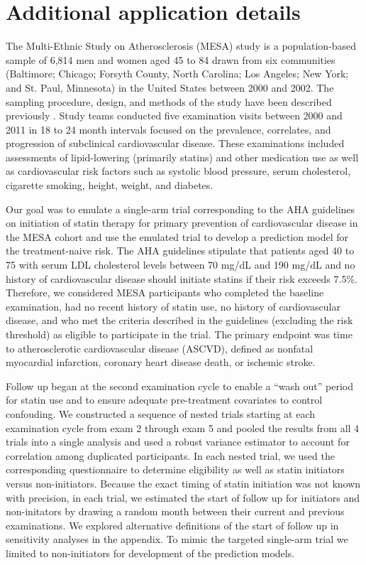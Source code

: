 \newpage
\section{Additional application details}
The Multi-Ethnic Study on Atherosclerosis (MESA) study is a population-based sample of 6,814 men and women aged 45 to 84 drawn from six communities (Baltimore; Chicago; Forsyth County, North Carolina; Los Angeles; New York; and St. Paul, Minnesota) in the United States between 2000 and 2002. The sampling procedure, design, and methods of the study have been described previously \cite{bild_multi-ethnic_2002}. Study teams conducted five examination visits between 2000 and 2011 in 18 to 24 month intervals focused on the prevalence, correlates, and progression of subclinical cardiovascular disease. These examinations included assessments of lipid-lowering (primarily statins) and other medication use as well as cardiovascular risk factors such as systolic blood pressure, serum cholesterol, cigarette smoking, height, weight, and diabetes. 

Our goal was to emulate a single-arm trial corresponding to the AHA guidelines on initiation of statin therapy for primary prevention of cardiovascular disease in the MESA cohort and use the emulated trial to develop a prediction model for the treatment-naive risk. The AHA guidelines stipulate that patients aged 40 to 75 with serum LDL cholesterol levels between 70 mg/dL and 190 mg/dL and no history of cardiovascular disease should initiate statins if their risk exceeds 7.5\%. Therefore, we considered MESA participants who completed the baseline examination, had no recent history of statin use, no history of cardiovascular disease, and who met the criteria described in the guidelines (excluding the risk threshold) as eligible to participate in the trial. The primary endpoint was time to atherosclerotic cardiovascular disease (ASCVD), defined as nonfatal myocardial infarction, coronary heart disease death, or ischemic stroke. 

Follow up began at the second examination cycle to enable a ``wash out'' period for statin use and to ensure adequate pre-treatment covariates to control confouding. We constructed a sequence of nested trials starting at each examination cycle from exam 2 through exam 5 and pooled the results from all 4 trials into a single analysis and used a robust variance estimator to account for correlation among duplicated participants. In each nested trial, we used the corresponding questionnaire to determine eligibility as well as statin initiators versus non-initiators. Because the exact timing of statin initiation was not known with precision, in each trial, we estimated the start of follow up for initiators and non-initators by drawing a random month between their current and previous examinations. We explored alternative definitions of the start of follow up in sensitivity analyses in the appendix. To mimic the targeted single-arm trial we limited to non-initiators for development of the prediction models.

